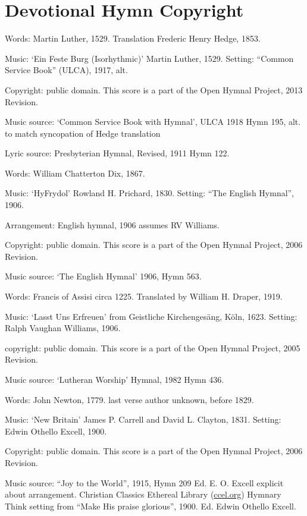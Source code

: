 \section*{Devotional Hymn Copyright}
\begin{multicols}{2}

\par\noindent
Words: Martin Luther, 1529. Translation Frederic Henry Hedge, 1853.
\par\noindent
Music: `Ein Feste Burg (Isorhythmic)' Martin Luther, 1529.  Setting: ``Common Service Book'' (ULCA), 1917, alt.
\par\noindent
Copyright: public domain. This score is a part of the Open Hymnal Project, 2013 Revision.
\par\noindent
Music source: `Common Service Book with Hymnal', ULCA 1918 Hymn 195, alt. to match syncopation of Hedge translation
\par\noindent
Lyric source: Presbyterian Hymnal, Revised, 1911 Hymn 122.

\par\noindent
Words: William Chatterton Dix, 1867. 
\par\noindent
Music: `HyFrydol' Rowland H. Prichard, 1830.  Setting: ``The English Hymnal'', 1906.
\par\noindent
Arrangement: English hymnal, 1906 assumes RV Williams.
\par\noindent
Copyright: public domain. This score is a part of the Open Hymnal Project, 2006 Revision.
\par\noindent
Music source: `The English Hymnal' 1906, Hymn 563. 

\par\noindent
Words: Francis of Assisi circa 1225. Translated by William H. Draper, 1919. 
\par\noindent
Music: `Lasst Uns Erfreuen' from Geistliche Kirchengesäng, Köln, 1623. Setting: Ralph Vaughan Williams, 1906.
\par\noindent
copyright: public domain. This score is a part of the Open Hymnal Project, 2005 Revision.
\par\noindent
Music source: `Lutheran Worship' Hymnal, 1982 Hymn 436.

\par\noindent
Words: John Newton, 1779.  last verse author unknown, before 1829.
\par\noindent
Music: `New Britain' James P. Carrell and David L. Clayton, 1831.  Setting: Edwin Othello Excell, 1900.
\par\noindent
Copyright: public domain. This score is a part of the Open Hymnal Project, 2006 Revision.
\par\noindent
Music source: ``Joy to the World'', 1915, Hymn 209 Ed. E. O. Excell  explicit about arrangement.  Christian Classics Ethereal Library (\url{ccel.org}) Hymnary  Think setting from ``Make His praise glorious'', 1900.  Ed. Edwin Othello Excell.


\end{multicols}
